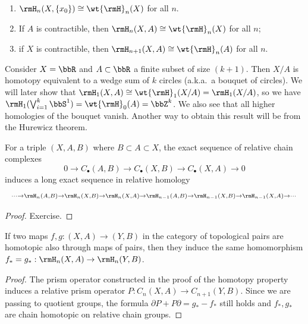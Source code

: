 \begin{cor}
    \begin{enumerate}
        \item $\rmH_n(X,
        \{x_0\})\cong\wt{\rmH}_n(X)$ for all $n$.
        \item If $A$ is contractible, then $\rmH_n(X,A)\cong \wt{\rmH}_n(X)$ for all $n$;
        \item if $X$ is contractible, then $\rmH_{n+1}(X,A)\cong \wt{\rmH}_n(A)$ for all $n$.
    \end{enumerate}
\end{cor}

\begin{example}
    Consider $X=\bbR$ and $A\subset \bbR$ a finite subset of size $(k+1)$. Then $X/A$ is homotopy equivalent to a wedge sum of $k$ circles (a.k.a.\ a bouquet of circles). We will later show that $\rmH_1(X,A)\cong \wt{\rmH}_1(X/A)= \rmH_1(X/A)$, so we have $\rmH_1(\bigvee_{i=1}^{k}\bbS^1)=\wt{\rmH}_0(A)=\bbZ^{k}$. We also see that all higher homologies of the bouquet vanish. Another way to obtain this result will be from the Hurewicz theorem.
\end{example}



\begin{prop}\label{exact sequence of a triple}
    For a triple $(X,A,B)$ where $B\subset A\subset X$, the exact sequence of relative chain complexes
    \[0\to C_\bullet(A,B)\to C_\bullet (X,B)\to C_\bullet(X,A)\to 0 \]
    induces a long exact sequence in relative homology
    \[\scriptstyle
    \cdots \to \rmH_n(A,B)\to \rmH_n(X,B)\to \rmH_n(X,A)\to \rmH_{n-1}(A,B)\to \rmH_{n-1}(X,B)\to \rmH_{n-1}(X,A)\to \cdots
    \]
\end{prop}
\begin{proof}
     Exercise.
\end{proof}


\begin{prop}
    If two maps $f,g:(X,A)\to (Y,B)$ in the category of topological pairs are homotopic also through maps of pairs, then they induce the same homomorphism $f_\ast=g_\ast:\rmH_n(X,A)\to \rmH_n(Y,B)$.
\end{prop}
\begin{proof}
     The prism operator constructed in the proof of the homotopy property induces a relative prism operator $P:C_n(X,A)\to C_{n+1}(Y,B)$. Since we are passing to quotient groups, the formula $\partial P+P\partial=g_\ast-f_\ast$ still holds and $f_\ast,g_\ast$ are chain homotopic on relative chain groups. 
\end{proof}


